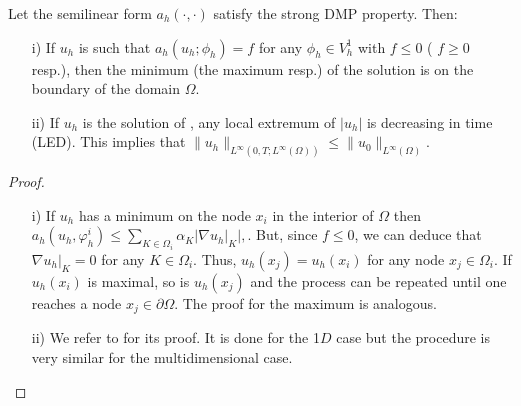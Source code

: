 \begin{lemma}
\label{lem-32}
Let the semilinear form $a_h(\cdot,\cdot)$ satisfy the strong DMP property. Then:
\begin{enumerate}
\item[i)]  If $u_h$ is such that $a_h(u_h;\phi_h) =f $  for any $ \phi_h\in V_h^1$ with $f\leq 0$ ( $f\geq 0$ resp.), then the minimum (the maximum resp.) of the solution is on the boundary of the domain $\Omega$.
\item[ii)] If  $u_h$ is the solution of , any local extremum of $|u_h|$ is decreasing in time (LED). This implies that $ \| u_h \|_{L^\infty(0,T;L^\infty(\Omega))} \leq \| u_0 \|_{L^\infty(\Omega)}$. 
\end{enumerate}
\end{lemma}
\begin{proof}
\begin{enumerate}
\item[i)] If $u_h$ has a minimum on the node $x_i$ in the interior of $\Omega$ then $a_h(u_h,\varphi_h^i)\leq \sum_{K\in \Omega_i} \alpha_K |\nabla u_h |_K |,$. But, since $f \leq 0$, we can deduce that $\nabla u_h |_K = 0$ for any $K\in \Omega_i$. Thus, $u_h(x_j)=u_h(x_i)$ for any node $x_j\in\Omega_i$. If $u_h(x_i)$ is maximal, so is $u_h(x_j)$ and the process can be repeated until one reaches a node $x_j\in \partial \Omega$. The proof for the maximum is analogous. 

\item[ii)] We refer to \cite[Lemma 3.2]{burman_nonlinear_2007} for its proof. It is done for the 1$D$ case but the procedure is very similar for the multidimensional case.
\end{enumerate}

\end{proof}

